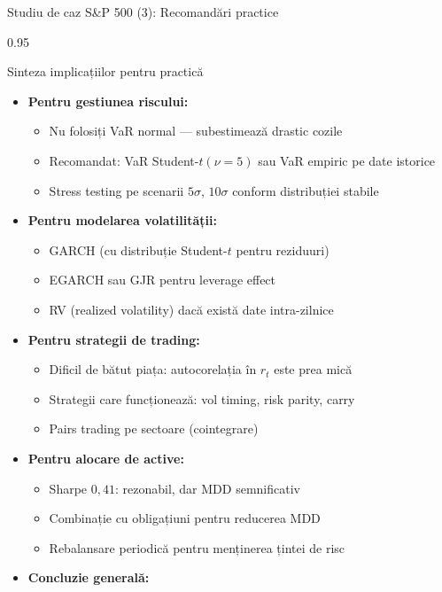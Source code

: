 \documentclass[9pt, aspectratio=169, t]{beamer}
\begin{document}
\begin{frame}[shrink=25]{Studiu de caz S\&P 500 (3): Recomandări practice}
\begin{cminipage}{0.95\textwidth}
\begin{block}{Sinteza implicațiilor pentru practică}
\begin{itemize}\setlength{\itemsep}{0pt}
    \item \textbf{Pentru gestiunea riscului:}
    \begin{itemize}\setlength{\itemsep}{0pt}
        \item Nu folosiți VaR normal --- subestimează drastic cozile
        \item Recomandat: VaR Student-$t(\nu = 5)$ sau VaR empiric pe date istorice
        \item Stress testing pe scenarii $5\sigma$, $10\sigma$ conform distribuției stabile
    \end{itemize}
    \item \textbf{Pentru modelarea volatilității:}
    \begin{itemize}\setlength{\itemsep}{0pt}
        \item GARCH (cu distribuție Student-$t$ pentru reziduuri)
        \item EGARCH sau GJR pentru leverage effect
        \item RV (realized volatility) dacă există date intra-zilnice
    \end{itemize}
    \item \textbf{Pentru strategii de trading:}
    \begin{itemize}\setlength{\itemsep}{0pt}
        \item Dificil de bătut piața: autocorelația în $r_t$ este prea mică
        \item Strategii care funcționează: vol timing, risk parity, carry
        \item Pairs trading pe sectoare (cointegrare)
    \end{itemize}
    \item \textbf{Pentru alocare de active:}
    \begin{itemize}\setlength{\itemsep}{0pt}
        \item Sharpe $0{,}41$: rezonabil, dar MDD semnificativ
        \item Combinație cu obligațiuni pentru reducerea MDD
        \item Rebalansare periodică pentru menținerea țintei de risc
    \end{itemize}
    \item \textbf{Concluzie generală:}

\end{itemize}
\end{block}
\end{cminipage}
\end{frame}
\end{document}
